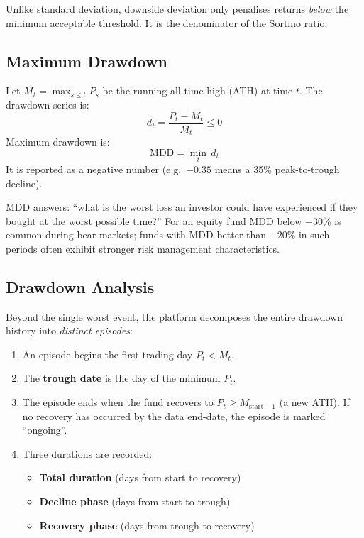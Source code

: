 \documentclass[12pt, a4paper]{article}
\begin{document}
Unlike standard deviation, downside deviation only penalises returns
\emph{below} the minimum acceptable threshold.  It is the denominator
of the Sortino ratio.

\subsection{Maximum Drawdown}

\begin{definition}
Let $M_t = \max_{s \leq t} P_s$ be the running all-time-high (ATH) at
time $t$.  The drawdown series is:
\[
  d_t = \frac{P_t - M_t}{M_t} \leq 0
\]
Maximum drawdown is:
\[
  \mathrm{MDD} = \min_t\, d_t
\]
It is reported as a negative number (e.g.\ $-0.35$ means a 35\% peak-to-trough
decline).
\end{definition}

\begin{interpretation}
MDD answers: ``what is the worst loss an investor could have experienced if
they bought at the worst possible time?''  For an equity fund MDD below
$-30\%$ is common during bear markets; funds with MDD better than $-20\%$
in such periods often exhibit stronger risk management characteristics.
\end{interpretation}

\subsection{Drawdown Analysis}

Beyond the single worst event, the platform decomposes the entire
drawdown history into \emph{distinct episodes}:

\begin{enumerate}[label=\arabic*.]
  \item An episode begins the first trading day $P_t < M_t$.
  \item The \textbf{trough date} is the day of the minimum $P_t$.
  \item The episode ends when the fund recovers to $P_t \geq M_{\text{start}-1}$
    (a new ATH).  If no recovery has occurred by the data end-date, the
    episode is marked ``ongoing''.
  \item Three durations are recorded:
  \begin{itemize}
    \item \textbf{Total duration} (days from start to recovery)
    \item \textbf{Decline phase} (days from start to trough)
    \item \textbf{Recovery phase} (days from trough to recovery)
  \end{itemize}
\end{enumerate}
\end{document}

